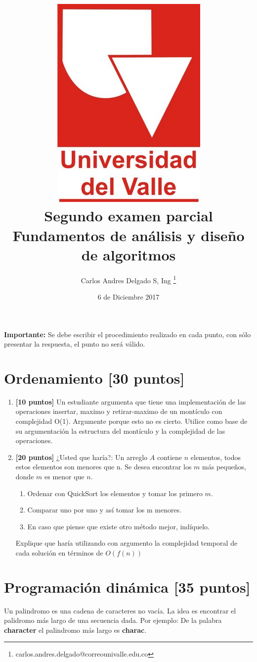 \documentclass[9pt,twocolumn]{article}
\title{\vspace{-2.5cm} \includegraphics[scale=0.15]{univalle.jpg} \\Segundo examen parcial \\ Fundamentos de análisis y diseño de algoritmos \\ \vspace{-0.5cm}}
\author{Carlos Andres Delgado S, Ing \footnote{ carlos.andres.delgado@correounivalle.edu.co }}
\date{\vspace{-0.2cm}6 de Diciembre 2017}
\newcommand{\raya}{\underline{\hspace{3cm}}}
\begin{document}
\maketitle
\vspace{-0.5cm}
\textbf{Importante:} Se debe escribir el procedimiento realizado en cada punto, con sólo presentar la respuesta, el punto no será válido.



\section{Ordenamiento \small{[30 puntos]}} 

\begin{enumerate}
	\item \textbf{[10 puntos]} Un estudiante argumenta que tiene una implementación de las operaciones insertar, maximo y retirar-maximo de un montículo con complejidad O(1). Argumente porque esto no es cierto. Utilice como base de su argumentación la estructura del montículo y la complejidad de las operaciones. 
	\item \textbf{[20 puntos]} ¿Usted que haría?: Un arreglo $A$ contiene $n$ elementos, todos estos elementos son menores que n. Se desea encontrar los $m$ más pequeños, donde $m$ es menor que $n$.
	\begin{enumerate}
		\item Ordenar con QuickSort los elementos y tomar los primero $m$.
		\item Comparar uno por uno y así tomar los m menores.
		\item En caso que piense que existe otro método mejor, indíquelo.
\end{enumerate}	 
Explique que haría utilizando con argumento la complejidad temporal de cada solución en términos de $O(f(n))$
\end{enumerate}

\section{Programación dinámica \small{[35 puntos]}} 

Un palindromo es una cadena de caracteres no vacía. La idea es encontrar el palidromo más largo de una secuencia dada. Por ejemplo: De la palabra \textbf{character} el palindromo más largo es \textbf{charac}. 
\end{document}
